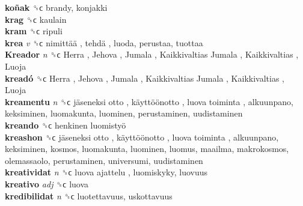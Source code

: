 \textbf{koñak} ␝ϲ  brandy, konjakki  \\
\textbf{krag} ␝ϲ  kaulain  \\
\textbf{kram} ␝ϲ  ripuli  \\
\textbf{krea} \emph{v}  ␝ϲ   nimittää ,  tehdä , luoda, perustaa, tuottaa  \\
\textbf{Kreador} \emph{n}  ␝ϲ   Herra ,  Jehova ,  Jumala ,  Kaikkivaltias Jumala ,  Kaikkivaltias ,  Luoja   \\
\textbf{kreadó} ␝ϲ   Herra ,  Jehova ,  Jumala ,  Kaikkivaltias Jumala ,  Kaikkivaltias ,  Luoja   \\
\textbf{kreamentu} \emph{n}  ␝ϲ   jäseneksi otto ,  käyttöönotto ,  luova toiminta , alkuunpano, keksiminen, luomakunta, luominen, perustaminen, uudistaminen  \\
\textbf{kreando} ␝ϲ   henkinen luomistyö   \\
\textbf{kreashon} ␝ϲ   jäseneksi otto ,  käyttöönotto ,  luova toiminta , alkuunpano, keksiminen, kosmos, luomakunta, luominen, luomus, maailma, makrokosmos, olemassaolo, perustaminen, universumi, uudistaminen  \\
\textbf{kreatividat} \emph{n}  ␝ϲ   luova ajattelu , luomiskyky, luovuus  \\
\textbf{kreativo} \emph{adj}  ␝ϲ  luova  \\
\textbf{kredibilidat} \emph{n}  ␝ϲ  luotettavuus, uskottavuus  \\
